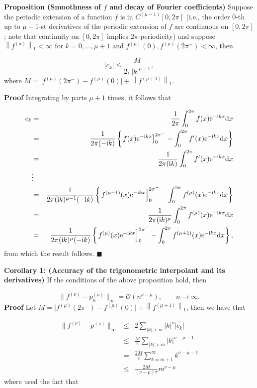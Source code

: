 \documentclass[12pt,a4paper]{article}
\begin{document}
\textbf{Proposition (Smoothness of $f$ and decay of Fourier coefficients)} Suppose the periodic extension of a function $f$ is in $C^{(\mu-1)}[0, 2\pi]$ (i.e., the order $0$-th up to $\mu-1$-st derivatives of the periodic extension of $f$ are continuous on $[0, 2\pi]$; note that continuity on $[0, 2\pi]$ implies $2\pi$-periodicity) and suppose $\left\| f^{(k)} \right\|_{1} < \infty$ for $k = 0, \ldots, \mu+1$ and $f^{(\mu)}(0), f^{(\mu)}(2\pi^{-}) < \infty$, then

\[
\left\vert c_k   \right\vert \leq  \frac{M}{2\pi \vert k \vert^{\mu+1}},
\]
where $M =  \vert f^{(\mu)}(2\pi^{-}) - f^{(\mu)}(0)   \vert + \left\|f^{(\mu+1)}   \right\|_1$.

\textbf{Proof} Integrating by parts $\mu+1$ times, it follows that


\begin{eqnarray*}
c_k &=& \frac{1}{2\pi}\int_{0}^{2\pi}f(x) {\rm e}^{-{\rm i}kx}{\rm d}x  \\
    &=& \frac{1}{2\pi(-{\rm i}k)}\left\lbrace \left.  f(x) {\rm e}^{-{\rm i}kx}\right]_{0}^{2\pi^{-}}  - \int_{0}^{2\pi}f'(x) {\rm e}^{-{\rm i}kx} {\rm d}x \right\rbrace \\
    &=& \frac{1}{2\pi({\rm i}k)} \int_{0}^{2\pi}f'(x) {\rm e}^{-{\rm i}kx} {\rm d}x \\
    &\vdots &   \\
    & = &  \frac{1}{2\pi({\rm i}k)^{\mu-1}(-{\rm i}k)}\left\lbrace \left.  f^{(\mu-1)}(x) {\rm e}^{-{\rm i}kx}\right]_{0}^{2\pi^{-}}  - \int_{0}^{2\pi}f^{(\mu)}(x) {\rm e}^{-{\rm i}kx} {\rm d}x \right\rbrace \\
    &=& \frac{1}{2\pi({\rm i}k)^{\mu}} \int_{0}^{2\pi}f^{(\mu)}(x) {\rm e}^{-{\rm i}kx} {\rm d}x \\
    &=& \frac{1}{2\pi({\rm i}k)^{\mu}(-{\rm i}k)}\left\lbrace \left.  f^{(\mu)}(x) {\rm e}^{-{\rm i}kx}\right]_{0}^{2\pi^{-}}  - \int_{0}^{2\pi}f^{(\mu+1)}(x) {\rm e}^{-{\rm i}kx} {\rm d}x \right\rbrace,
    \end{eqnarray*}
from which the result follows. $\blacksquare$

\textbf{Corollary 1: (Accuracy of the trigonometric interpolant and its derivatives)}  If the conditions of the above proposition hold, then

\[
\| f^{(\nu)} - p_n^{(\nu)} \|_{\infty} = \mathcal{O}(n^{\nu-\mu}), \qquad n \to \infty.
\]
\textbf{Proof} Let $M  = \vert f^{(\mu)}(2\pi^{-}) - f^{(\mu)}(0)   \vert + \left\|f^{(\mu+1)}   \right\|_1$, then we have that


\begin{eqnarray*}
\| f^{(\nu)} - p^{(\nu)}  \|_{\infty} & \leq  & 2\sum_{\vert k \vert > m} \vert k \vert^{\nu} \vert c_k \vert  \\
& \leq & \frac{M}{\pi } \sum_{\vert k \vert > m} \vert k \vert^{\nu-\mu-1} \\
& = & \frac{2M}{\pi } \sum_{ k = m+1}^{\infty}  k^{\nu-\mu-1} \\
& \leq & \frac{2M}{(\nu-\mu)\pi  } m^{\nu-\mu}
\end{eqnarray*}
where used the fact that
\end{document}

